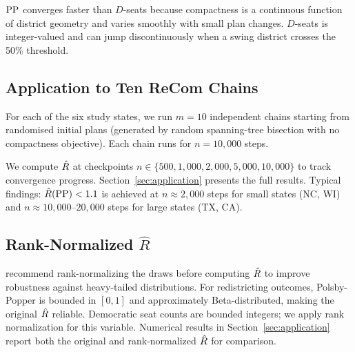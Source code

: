 $\mathrm{PP}$ converges faster than $D$-seats because compactness is a continuous
function of district geometry and varies smoothly with small plan changes.
$D$-seats is integer-valued and can jump discontinuously when a swing
district crosses the 50\% threshold.

\subsection{Application to Ten ReCom Chains}

For each of the six study states, we run $m = 10$ independent \recom{}
chains starting from randomised initial plans (generated by random
spanning-tree bisection with no compactness objective).
Each chain runs for $n = 10{,}000$ steps.

We compute $\hat{R}$ at checkpoints $n \in \{500, 1{,}000, 2{,}000, 5{,}000, 10{,}000\}$
to track convergence progress.
Section~\ref{sec:application} presents the full results.
Typical findings: $\hat{R}(\mathrm{PP}) < 1.1$ is achieved at $n \approx 2{,}000$
steps for small states (NC, WI) and $n \approx 10{,}000$--$20{,}000$
steps for large states (TX, CA).

\subsection{Rank-Normalized $\hat{R}$}

\citet{vehtari2021} recommend rank-normalizing the draws before computing
$\hat{R}$ to improve robustness against heavy-tailed distributions.
For redistricting outcomes, Polsby-Popper is bounded in $[0, 1]$ and
approximately Beta-distributed, making the original $\hat{R}$ reliable.
Democratic seat counts are bounded integers; we apply rank normalization
for this variable.
Numerical results in Section~\ref{sec:application} report both the
original and rank-normalized $\hat{R}$ for comparison.
